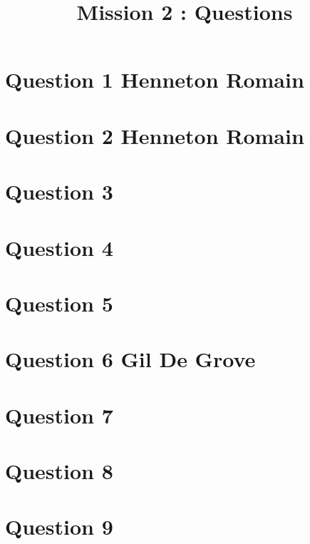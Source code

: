 \documentclass{article}
\begin{document}
\title{Mission 2 : Questions}
\maketitle
\section*{Question 1 Henneton Romain}
\section*{Question 2 Henneton Romain}
\section*{Question 3}
\section*{Question 4}
\section*{Question 5}
\section*{Question 6 Gil De Grove}

\section*{Question 7}
\section*{Question 8}
\section*{Question 9}
\end{document}
